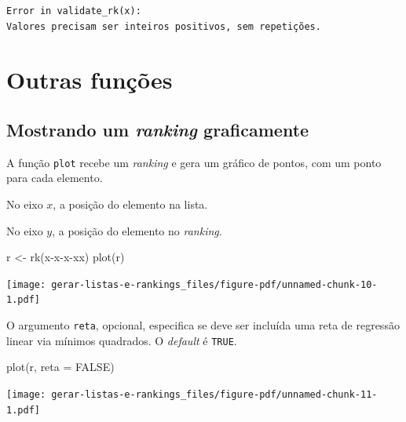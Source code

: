 \documentclass[
  letterpaper,
  DIV=11,
  numbers=noendperiod]{scrreprt}
\newenvironment{Shaded}{\begin{snugshade}}{\end{snugshade}}
\newcommand{\AttributeTok}[1]{\textcolor[rgb]{0.40,0.45,0.13}{#1}}
\newcommand{\ConstantTok}[1]{\textcolor[rgb]{0.56,0.35,0.01}{#1}}
\newcommand{\FunctionTok}[1]{\textcolor[rgb]{0.28,0.35,0.67}{#1}}
\newcommand{\NormalTok}[1]{\textcolor[rgb]{0.00,0.23,0.31}{#1}}
\newcommand{\OtherTok}[1]{\textcolor[rgb]{0.00,0.23,0.31}{#1}}
\newcommand{\StringTok}[1]{\textcolor[rgb]{0.13,0.47,0.30}{#1}}
\begin{document}
\begin{verbatim}
Error in validate_rk(x): 
Valores precisam ser inteiros positivos, sem repetições.
\end{verbatim}

\section{Outras funções}\label{outras-funuxe7uxf5es}

\subsection{\texorpdfstring{Mostrando um \emph{ranking}
graficamente}{Mostrando um ranking graficamente}}\label{mostrando-um-ranking-graficamente}

A função \texttt{plot} recebe um \emph{ranking} e gera um gráfico de
pontos, com um ponto para cada elemento.

No eixo $x$, a posição do elemento na lista.

No eixo $y$, a posição do elemento no \emph{ranking}.

\begin{Shaded}
\begin{Highlighting}[]
\NormalTok{r }\OtherTok{\textless{}{-}} \FunctionTok{rk}\NormalTok{(}\StringTok{\textquotesingle{}x{-}x{-}x{-}xx\textquotesingle{}}\NormalTok{)}
\FunctionTok{plot}\NormalTok{(r)}
\end{Highlighting}
\end{Shaded}

\begin{center}
\texttt{[image: gerar-listas-e-rankings\_files/figure-pdf/unnamed-chunk-10-1.pdf]}
\end{center}

O argumento \texttt{reta}, opcional, especifica se deve ser incluída uma
reta de regressão linear via mínimos quadrados. O \emph{default} é
\texttt{TRUE}.

\begin{Shaded}
\begin{Highlighting}[]
\FunctionTok{plot}\NormalTok{(r, }\AttributeTok{reta =} \ConstantTok{FALSE}\NormalTok{)}
\end{Highlighting}
\end{Shaded}

\begin{center}
\texttt{[image: gerar-listas-e-rankings\_files/figure-pdf/unnamed-chunk-11-1.pdf]}
\end{center}
\end{document}
